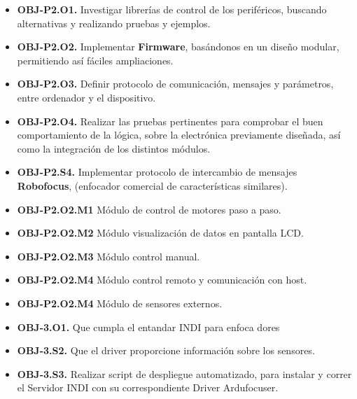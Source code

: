 \begin{itemize}
  \item \textbf{OBJ-P2.O1.} Investigar librerías de control de los periféricos, buscando alternativas y realizando pruebas y ejemplos.
  \item \textbf{OBJ-P2.O2.} Implementar \textbf{Firmware}, basándonos en un diseño modular, permitiendo así fáciles ampliaciones.
  \item \textbf{OBJ-P2.O3.} Definir protocolo de comunicación, mensajes y parámetros, entre ordenador y el dispositivo.

  \item \textbf{OBJ-P2.O4.} Realizar las pruebas pertinentes para comprobar el buen comportamiento de la lógica, sobre la electrónica previamente diseñada, así como la integración de los distintos módulos.
  \item \textbf{OBJ-P2.S4.} Implementar protocolo de intercambio de mensajes \textbf{Robofocus}, (enfocador comercial de características similares).
\end{itemize}

\begin{itemize}
\item \textbf{OBJ-P2.O2.M1} Módulo de control de motores paso a paso.
\item \textbf{OBJ-P2.O2.M2} Módulo visualización de datos en pantalla LCD.
\item \textbf{OBJ-P2.O2.M3} Módulo control manual.
\item \textbf{OBJ-P2.O2.M4} Módulo control remoto y comunicación con host.
\item \textbf{OBJ-P2.O2.M4} Módulo de sensores externos.
\end{itemize}


\begin{itemize}
  \item \textbf{OBJ-3.O1.} Que cumpla el entandar INDI para enfoca dores
  \item \textbf{OBJ-3.S2.} Que el driver proporcione información sobre los sensores.
  \item \textbf{OBJ-3.S3.} Realizar script de despliegue automatizado, para instalar y correr el Servidor INDI con su correspondiente Driver Ardufocuser.

\end{itemize}


